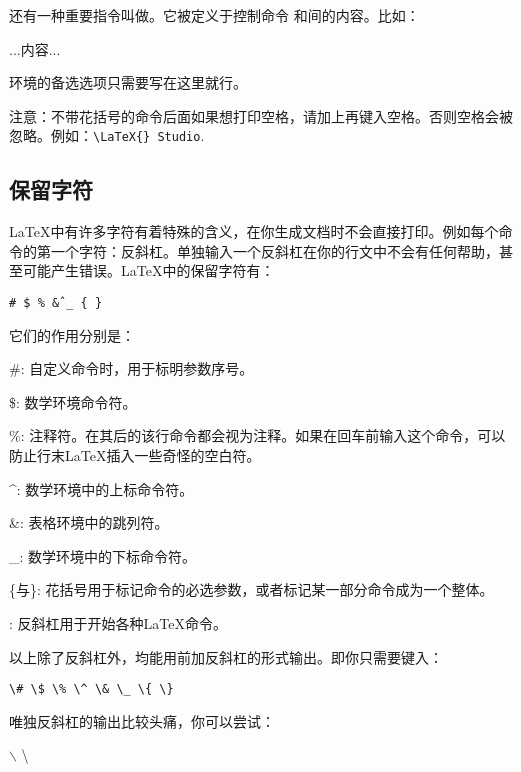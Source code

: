 还有一种重要指令叫做。它被定义于控制命令 和间的内容。比如：
\begin{latex}

...内容...

\end{latex}

环境的备选选项只需要写在这里就行。

注意：不带花括号的命令后面如果想打印空格，请加上再键入空格。否则空格会被忽略。例如：\verb+\LaTeX{} Studio+.

\subsection{保留字符}

\LaTeX 中有许多字符有着特殊的含义，在你生成文档时不会直接打印。例如每个命令的第一个字符：反斜杠。单独输入一个反斜杠在你的行文中不会有任何帮助，甚至可能产生错误。\LaTeX 中的保留字符有：
\begin{center}
\texttt{\# \$ \% \^ \& \_ \{ \} }
\end{center}

它们的作用分别是：
\begin{para}
\item[\#{}:] 自定义命令时，用于标明参数序号。
\item[\${}:] 数学环境命令符。
\item[\%{}:] 注释符。在其后的该行命令都会视为注释。如果在回车前输入这个命令，可以防止行末\LaTeX 插入一些奇怪的空白符。
\item[\^{}:] 数学环境中的上标命令符。
\item[\&{}:] 表格环境中的跳列符。
\item[\_{}:] 数学环境中的下标命令符。
\item[\{与\}:] 花括号用于标记命令的必选参数，或者标记某一部分命令成为一个整体。
\item[\char92{}:] 反斜杠用于开始各种\LaTeX 命令。
\end{para}

以上除了反斜杠外，均能用前加反斜杠的形式输出。即你只需要键入：
\begin{center}
\verb|\# \$ \% \^ \& \_ \{ \}|
\end{center}

唯独反斜杠的输出比较头痛，你可以尝试：
\begin{codeshow}
$\backslash$ \textbackslash
\texttt{}
\end{codeshow}

